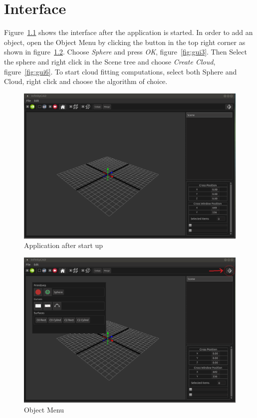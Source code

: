 \documentclass{book}
\begin{document}
\chapter{Interface}

Figure~\ref{fig:gui1} shows the interface after the application is started. In order to add an object, open the Object Menu by clicking the button in the top right corner as shown in figure~\ref{fig:gui2}. Choose \textit{Sphere} and press \textit{OK}, figure~\ref{fig:gui3}. Then Select the sphere and right click in the Scene tree and choose \textit{Create Cloud}, figure~\ref{fig:gui6}. To start cloud fitting computations, select both Sphere and Cloud, right click and choose the algorithm of choice.

\begin{figure}[H]
    \includegraphics[width=1\textwidth]{./graphics/gui/gui1.png}
    \caption{Application after start up}
    \label{fig:gui1}
\end{figure}

\begin{figure}[H]
    \includegraphics[width=1\textwidth]{./graphics/gui/gui2.png}
    \caption{Object Menu}
    \label{fig:gui2}
\end{figure}
\end{document}
